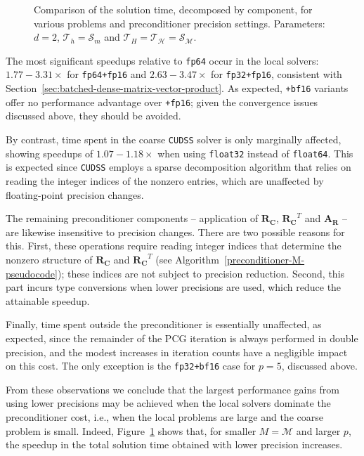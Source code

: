 \documentclass[11pt]{article}
\theoremstyle{definition}
\theoremstyle{theorem}
\begin{document}
\begin{figure}
  \centering
  
  \caption{Comparison of the solution time, decomposed by component, for various
  problems and preconditioner precision settings. Parameters:
  $d=2$, $\mathcal{T}_h=\mathcal{S}_m$ and
  $\mathcal{T}_H=\mathcal{T}_\mathcal{H}=\mathcal{S}_\mathcal{M}$.}
  \label{fig:precision-plots}
\end{figure}

The most significant speedups relative to \verb|fp64| occur in the local solvers:
$1.77-3.31\times$ for \verb|fp64+fp16| and $2.63-3.47\times$ for
\verb|fp32+fp16|, consistent with Section~\ref{sec:batched-dense-matrix-vector-product}.
As expected, \verb|+bf16| variants offer no performance advantage
over \verb|+fp16|; given the convergence issues discussed above, they should be avoided.

By contrast, time spent in the coarse \verb|CUDSS| solver is only marginally
affected, showing speedups of $1.07 - 1.18\times$ when using \verb|float32| instead
of \verb|float64|. This is expected since \verb|CUDSS| employs a sparse
decomposition algorithm that relies on reading the integer indices of the
nonzero entries, which are unaffected by floating-point precision changes.

The remaining preconditioner components -- application of $\bm{R_C}$, $\bm{R_C}^T$ and $\bm{A_R}$
-- are likewise insensitive to precision changes. There are two possible reasons
for this. First, these operations require reading integer indices that determine the nonzero
structure of $\bm{R_C}$ and $\bm{R_C}^T$ (see Algorithm~\ref{preconditioner-M-pseudocode});
these indices are not subject to precision reduction. Second, this part incurs
type conversions when lower precisions are used, which reduce the attainable
speedup.

Finally, time spent outside the preconditioner is essentially unaffected,
as expected, since the remainder of the PCG iteration is always performed in
double precision, and the modest increases in iteration counts have a negligible
impact on this cost. The only exception is the \verb|fp32+bf16| case for $p=5$,
discussed above.

From these observations we conclude that the largest performance
gains from using lower precisions may be achieved when the local solvers dominate
the preconditioner cost, i.e., when the local problems are large and the coarse
problem is small. Indeed, Figure~\ref{fig:precision-plots} shows that, for smaller
$M=\mathcal{M}$ and larger $p$, the speedup in the total solution time obtained
with lower precision increases.
\end{document}
